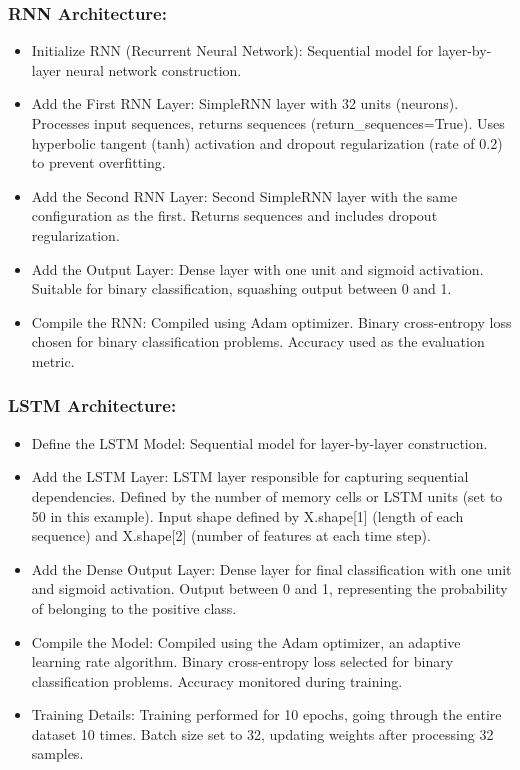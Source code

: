 \documentclass[ 12pt,a4paper,twocolumn,fleqn]{report}
\begin{document}
\subsubsection{RNN Architecture:}
\vspace{2mm}
\begin{itemize}
    \item Initialize RNN (Recurrent Neural Network): Sequential model for layer-by-layer neural network
construction.
\item Add the First RNN Layer: SimpleRNN layer with 32 units (neurons). Processes input sequences,
returns sequences (return\_sequences=True). Uses hyperbolic tangent (tanh) activation and
dropout regularization (rate of 0.2) to prevent overfitting.
\item Add the Second RNN Layer: Second SimpleRNN layer with the same configuration as the first.
Returns sequences and includes dropout regularization.
\item Add the Output Layer: Dense layer with one unit and sigmoid activation. Suitable for binary
classification, squashing output between 0 and 1.
\item Compile the RNN: Compiled using Adam optimizer. Binary cross-entropy loss chosen for
binary classification problems. Accuracy used as the evaluation metric.

\end{itemize}
\subsubsection{LSTM Architecture:}
\vspace{2mm}
\begin{itemize}
    \item Define the LSTM Model: Sequential model for layer-by-layer construction.
\item Add the LSTM Layer: LSTM layer responsible for capturing sequential dependencies. Defined
by the number of memory cells or LSTM units (set to 50 in this example). Input shape defined
by X.shape[1] (length of each sequence) and X.shape[2] (number of features at each time step).
\item Add the Dense Output Layer: Dense layer for final classification with one unit and sigmoid
activation. Output between 0 and 1, representing the probability of belonging to the positive
class.
\item Compile the Model: Compiled using the Adam optimizer, an adaptive learning rate algorithm.
Binary cross-entropy loss selected for binary classification problems. Accuracy monitored
during training.
\item Training Details: Training performed for 10 epochs, going through the entire dataset 10 times.
Batch size set to 32, updating weights after processing 32 samples.
\end{itemize}
\newpage
  \pagestyle{fancy}
\thisfancypage{%
  \setlength{\fboxsep}{20pt}\doublebox}{}
\normalsize
\end{document}
